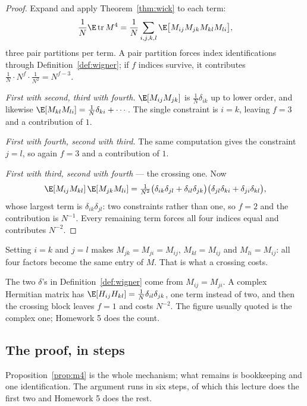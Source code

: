 \documentclass[11pt]{article}
\providecommand{\Tr}{\operatorname{tr}}
\begin{document}
\begin{proof}
Expand and apply Theorem~\ref{thm:wick} to each term:
\[
\frac1N\E\Tr M^4=\frac1N\sum_{i,j,k,l}\E\big[M_{ij}M_{jk}M_{kl}M_{li}\big],
\]
three pair partitions per term. A pair partition forces index identifications through Definition~\ref{def:wigner}; if $f$ indices survive, it contributes $\frac1N\cdot N^{f}\cdot\frac1{N^{2}}=N^{f-3}$.

\emph{First with second, third with fourth.} $\E[M_{ij}M_{jk}]$ is $\frac1N\delta_{ik}$ up to lower order, and likewise $\E[M_{kl}M_{li}]=\frac1N\delta_{ki}+\cdots$. The single constraint is $i=k$, leaving $f=3$ and a contribution of $1$.

\emph{First with fourth, second with third.} The same computation gives the constraint $j=l$, so again $f=3$ and a contribution of $1$.

\emph{First with third, second with fourth} --- the crossing one. Now
\[
\E[M_{ij}M_{kl}]\,\E[M_{jk}M_{li}]=\tfrac1{N^2}\big(\delta_{ik}\delta_{jl}+\delta_{il}\delta_{jk}\big)\big(\delta_{jl}\delta_{ki}+\delta_{ji}\delta_{kl}\big),
\]
whose largest term is $\delta_{ik}\delta_{jl}$: two constraints rather than one, so $f=2$ and the contribution is $N^{-1}$. Every remaining term forces all four indices equal and contributes $N^{-2}$.
\end{proof}

\begin{remark}
Setting $i=k$ and $j=l$ makes $M_{jk}=M_{ji}=M_{ij}$, $M_{kl}=M_{ij}$ and $M_{li}=M_{ij}$: all four factors become the same entry of $M$. That is what a crossing costs.
\end{remark}

\begin{remark}
The two $\delta$'s in Definition~\ref{def:wigner} come from $M_{ij}=M_{ji}$. A complex Hermitian matrix has $\E[H_{ij}H_{kl}]=\frac1N\delta_{il}\delta_{jk}$, one term instead of two, and then the crossing block leaves $f=1$ and costs $N^{-2}$. The figure usually quoted is the complex one; Homework 5 does the count.
\end{remark}

\subsection{The proof, in steps}

Proposition~\ref{prop:m4} is the whole mechanism; what remains is bookkeeping and one identification. The argument runs in six steps, of which this lecture does the first two and Homework 5 does the rest.
\end{document}
